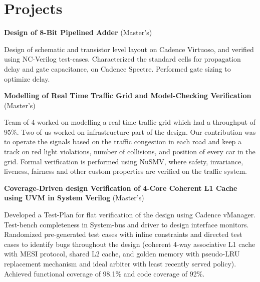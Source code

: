 \documentclass[letterpaper,11pt]{article}
\begin{document}
\vspace{-12 pt}
\section{Projects}
 \begin{itemize}[leftmargin=0in, label={}]
    \small{\item{
     \textbf{Design of 8-Bit Pipelined Adder} \hspace{\fill} (Master's)
     \vspace{-10 pt}
     \begin{justify}
     Design of schematic and transistor level layout on Cadence Virtuoso, and verified using NC-Verilog test-cases. Characterized the standard cells for propagation delay and gate capacitance, on Cadence Spectre. Performed gate sizing to optimize delay.
     \end{justify} 
     \vspace{1 pt}
     
    \textbf{Modelling of Real Time Traffic Grid and Model-Checking Verification} \hspace{\fill} (Master's)
     \vspace{-10 pt}
     \begin{justify}
     Team of 4 worked on modelling a real time traffic grid which had a throughput of 95\%. Two of us worked on infrastructure part of the design. Our contribution was to operate the signals based on the traffic congestion in each road and keep a track on red light violations, number of collisions, and position of every car in the grid. Formal verification is performed using NuSMV, where safety, invariance, liveness, fairness and other custom properties are verified on the traffic system.
     \end{justify} 
     \vspace{1 pt}
     
   \textbf{Coverage-Driven design Verification of 4-Core Coherent L1 Cache using UVM in System Verilog} \hspace{\fill} (Master's)
     \vspace{-10 pt}
     \begin{justify}
     Developed a Test-Plan for flat verification of the design using Cadence vManager. Test-bench completeness in System-bus and driver to design interface monitors. Randomized pre-generated test cases with inline constraints and directed test cases to identify bugs throughout the design (coherent 4-way associative L1 cache with MESI protocol, shared L2 cache, and golden memory with pseudo-LRU replacement mechanism and ideal arbiter with least recently served policy). Achieved functional coverage of 98.1\% and code coverage of 92\%.
     \end{justify}
    
}}
\end{itemize}
\end{document}
